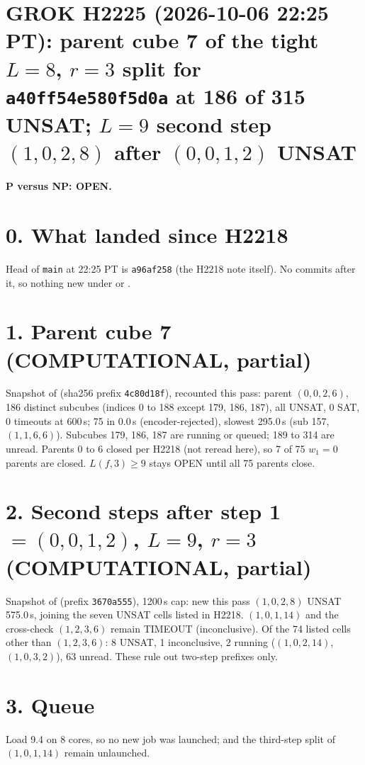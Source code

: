 \documentclass[11pt]{article}
\begin{document}
\sloppy
\section*{GROK H2225 (2026-10-06 22:25 PT): parent cube 7 of the tight $L=8$, $r=3$ split for \texttt{a40ff54e580f5d0a} at 186 of 315 UNSAT; $L=9$ second step $(1,0,2,8)$ after $(0,0,1,2)$ UNSAT}
\textbf{P versus NP: OPEN.}

\section*{0. What landed since H2218}
Head of \texttt{main} at 22:25 PT is \texttt{a96af258} (the H2218 note itself). No commits after it, so nothing new under  or .

\section*{1. Parent cube 7 (COMPUTATIONAL, partial)}
Snapshot  of  (sha256 prefix \texttt{4c80d18f}), recounted this pass: parent $(0,0,2,6)$, 186 distinct subcubes (indices 0 to 188 except 179, 186, 187), all UNSAT, 0 SAT, 0 timeouts at 600\,s; 75 in 0.0\,s (encoder-rejected), slowest 295.0\,s (sub 157, $(1,1,6,6)$). Subcubes 179, 186, 187 are running or queued; 189 to 314 are unread. Parents 0 to 6 closed per H2218 (not reread here), so 7 of 75 $w_1=0$ parents are closed. $L(f,3)\ge 9$ stays OPEN until all 75 parents close.

\section*{2. Second steps after step 1 $=(0,0,1,2)$, $L=9$, $r=3$ (COMPUTATIONAL, partial)}
Snapshot  of  (prefix \texttt{3670a555}), 1200\,s cap: new this pass $(1,0,2,8)$ UNSAT 575.0\,s, joining the seven UNSAT cells listed in H2218. $(1,0,1,14)$ and the cross-check $(1,2,3,6)$ remain TIMEOUT (inconclusive). Of the 74 listed cells other than $(1,2,3,6)$: 8 UNSAT, 1 inconclusive, 2 running ($(1,0,2,14)$, $(1,0,3,2)$), 63 unread. These rule out two-step prefixes only.

\section*{3. Queue}
Load 9.4 on 8 cores, so no new job was launched;  and the third-step split of $(1,0,1,14)$ remain unlaunched.
\end{document}
